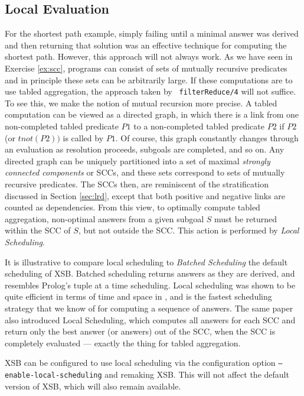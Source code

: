 \subsection{Local Evaluation} \label{sec:local}

For the shortest path example, simply failing until a minimal answer
was derived and then returning that solution was an effective
technique for computing the shortest path.  However, this approach
will not always work.  As we have seen in Exercise \ref{ex:scc},
programs can consist of sets of mutually recursive predicates and in
principle these sets can be arbitrarily large.  If these computations
are to use tabled aggregation, the approach taken by {\tt
filterReduce/4} will not suffice.  To see this, we make the notion of
mutual recursion more precise.  A tabled computation can be viewed as
a directed graph, in which there is a link from one non-completed
tabled predicate $P1$ to a non-completed tabled predicate $P2$ if $P2$
(or $tnot(P2))$ is called by $P1$.  Of course, this graph constantly
changes through an evaluation as resolution proceeds, subgoals are
completed, and so on.  Any directed graph can be uniquely partitioned
into a set of maximal {\em strongly connected components} or SCCs, and
these sets correspond to sets of mutually recursive predicates.  The
SCCs then, are reminiscent of the \LRD stratification discussed in
Section \ref{sec:lrd}, except that both positive and negative links
are counted as dependencies.  From this view, to optimally compute
tabled aggregation, non-optimal answers from a given subgoal $S$ must
be returned within the SCC of $S$, but not outside the SCC.  This
action is performed by {\em Local Scheduling}.

It is illustrative to compare local scheduling to {\em Batched
Scheduling} the default scheduling of XSB.  Batched scheduling returns
answers as they are derived, and resembles Prolog's tuple at a time
scheduling.  Local scheduling was shown to be quite efficient in terms
of time and space in \cite{JFLP-Scheduling}, and is the fastest
scheduling strategy that we know of for computing a sequence of
answers.  The same paper also introduced Local Scheduling, which
computes all answers for each SCC and return only the best answer (or
answers) out of the SCC, when the SCC is completely evaluated ---
exactly the thing for tabled aggregation.

XSB can be configured to use local scheduling via the configuration
option {\tt --enable-local-scheduling} and remaking XSB.  This will
not affect the default version of XSB, which will also remain
available.


